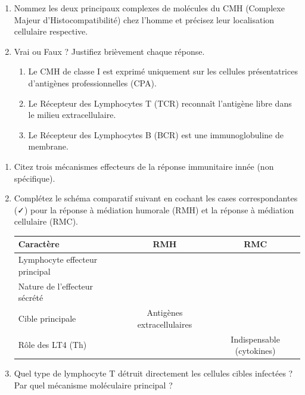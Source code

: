\documentclass[11pt]{article}
\begin{document}
\begin{exercice}
\begin{enumerate}
    \item Nommez les deux principaux complexes de molécules du CMH (Complexe Majeur d'Histocompatibilité) chez l'homme et précisez leur localisation cellulaire respective.
    \item Vrai ou Faux ? Justifiez brièvement chaque réponse.
    \begin{enumerate}
        \item Le CMH de classe I est exprimé uniquement sur les cellules présentatrices d'antigènes professionnelles (CPA).
        \item Le Récepteur des Lymphocytes T (TCR) reconnaît l'antigène libre dans le milieu extracellulaire.
        \item Le Récepteur des Lymphocytes B (BCR) est une immunoglobuline de membrane.
    \end{enumerate}
\end{enumerate}
\end{exercice}

\begin{exercice}
\begin{enumerate}
    \item Citez trois mécanismes effecteurs de la réponse immunitaire innée (non spécifique).
    \item Complétez le schéma comparatif suivant en cochant les cases correspondantes (✓) pour la réponse à médiation humorale (RMH) et la réponse à médiation cellulaire (RMC).
    \begin{tabularx}{\linewidth}{|X|c|c|}
    \hline
    \textbf{Caractère} & \textbf{RMH} & \textbf{RMC} \\
    \hline
    Lymphocyte effecteur principal & & \\
    \hline
    Nature de l'effecteur sécrété & & \\
    \hline
    Cible principale & Antigènes extracellulaires & \\
    \hline
    Rôle des LT4 (Th) & & Indispensable (cytokines) \\
    \hline
    \end{tabularx}
    \item Quel type de lymphocyte T détruit directement les cellules cibles infectées ? Par quel mécanisme moléculaire principal ?
\end{enumerate}
\end{exercice}
\end{document}
